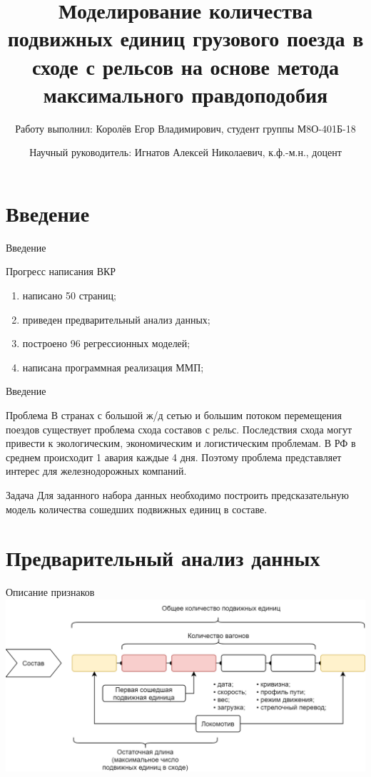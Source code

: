 \documentclass[aspectratio=169]{beamer}
\title[Моделирование количества сошедших вагонов]{Моделирование количества подвижных единиц грузового поезда в сходе с рельсов на основе метода максимального правдоподобия}
\author[Е.В.Королёв \and А.Н.Игнатов]{Работу выполнил: Королёв Егор Владимирович, студент группы М8О-401Б-18 \and Научный руководитель: Игнатов Алексей Николаевич, к.ф.-м.н., доцент}
\institute[НИУ МАИ]{Московский авиационный институт (НИУ)}
\begin{document}
    \begin{frame}
        \maketitle
    \end{frame}


    \section{Введение}
    \begin{frame}{Введение}
        \begin{block}{Прогресс написания ВКР}
            \begin{enumerate}
                \item написано 50 страниц;
                \item приведен предварительный анализ данных;
                \item построено 96 регрессионных моделей;
                \item написана программная реализация ММП;
            \end{enumerate}
        \end{block}
    \end{frame}

    
    \begin{frame}{Введение}
        \begin{block}{Проблема}
            В странах с большой ж/д сетью и большим потоком перемещения поездов существует проблема схода составов с рельс. Последствия схода могут привести к экологическим, экономическим и логистическим проблемам. В РФ в среднем происходит 1 авария каждые 4 дня. Поэтому проблема представляет интерес для железнодорожных компаний.
        \end{block}
    
        \begin{block}{Задача}
            Для заданного набора данных необходимо построить предсказательную модель количества сошедших подвижных единиц в составе.
        \end{block}
    \end{frame}


    \section{Предварительный анализ данных}
    \begin{frame}{Описание признаков}
        \centering
        \includegraphics[width=0.8\linewidth]{src/train.png}
    \end{frame}
\end{document}
